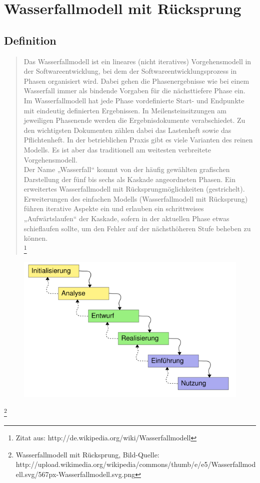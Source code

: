 \chapter{Wasserfallmodell mit Rücksprung}

\section{Definition}

\begin{quote}
Das Wasserfallmodell ist ein lineares (nicht iteratives) Vorgehensmodell in der Softwareentwicklung, bei dem der Softwareentwicklungsprozess in Phasen organisiert wird. Dabei gehen die Phasenergebnisse wie bei einem Wasserfall immer als bindende Vorgaben für die nächsttiefere Phase ein.\\

Im Wasserfallmodell hat jede Phase vordefinierte Start- und Endpunkte mit eindeutig definierten Ergebnissen. In Meilensteinsitzungen am jeweiligen Phasenende werden die Ergebnisdokumente verabschiedet. Zu den wichtigsten Dokumenten zählen dabei das Lastenheft sowie das Pflichtenheft. In der betrieblichen Praxis gibt es viele Varianten des reinen Modells. Es ist aber das traditionell am weitesten verbreitete Vorgehensmodell.\\

Der Name „Wasserfall“ kommt von der häufig gewählten grafischen Darstellung der fünf bis sechs als Kaskade angeordneten Phasen.
Ein erweitertes Wasserfallmodell mit Rücksprungmöglichkeiten (gestrichelt).\\

Erweiterungen des einfachen Modells (Wasserfallmodell mit Rücksprung) führen iterative Aspekte ein und erlauben ein schrittweises „Aufwärtslaufen“ der Kaskade, sofern in der aktuellen Phase etwas schieflaufen sollte, um den Fehler auf der nächsthöheren Stufe beheben zu können.\\

\footnote{Zitat aus:  http://de.wikipedia.org/wiki/Wasserfallmodell}
\end{quote}

\begin{figure}[h]
\centering
\includegraphics[scale=0.35]{567px-Wasserfallmodell.png}
\end{figure}
\footnote{Wasserfallmodell mit Rücksprung, Bild-Quelle: http://upload.wikimedia.org/wikipedia/commons/thumb/e/e5/Wasserfallmodell.svg/567px-Wasserfallmodell.svg.png}

